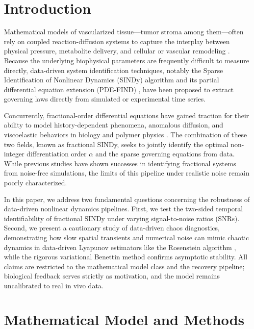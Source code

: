 \documentclass[review,3p,times]{elsarticle}
\begin{document}
\section{Introduction}
Mathematical models of vascularized tissue---tumor stroma among them---often rely on coupled reaction-diffusion systems to capture the interplay between physical pressure, metabolite delivery, and cellular or vascular remodeling \cite{brunton2016sindy, rudy2017data}. Because the underlying biophysical parameters are frequently difficult to measure directly, data-driven system identification techniques, notably the Sparse Identification of Nonlinear Dynamics (SINDy) algorithm \cite{brunton2016sindy} and its partial differential equation extension (PDE-FIND) \cite{rudy2017data}, have been proposed to extract governing laws directly from simulated or experimental time series. 

Concurrently, fractional-order differential equations have gained traction for their ability to model history-dependent phenomena, anomalous diffusion, and viscoelastic behaviors in biology and polymer physics \cite{podlubny1999fractional}. The combination of these two fields, known as fractional SINDy, seeks to jointly identify the optimal non-integer differentiation order $\alpha$ and the sparse governing equations from data. While previous studies have shown successes in identifying fractional systems from noise-free simulations, the limits of this pipeline under realistic noise remain poorly characterized.

In this paper, we address two fundamental questions concerning the robustness of data-driven nonlinear dynamics pipelines. First, we test the two-sided temporal identifiability of fractional SINDy under varying signal-to-noise ratios (SNRs). Second, we present a cautionary study of data-driven chaos diagnostics, demonstrating how slow spatial transients and numerical noise can mimic chaotic dynamics in data-driven Lyapunov estimators like the Rosenstein algorithm \cite{rosenstein1993practical}, while the rigorous variational Benettin method \cite{benettin1980lyapunov} confirms asymptotic stability. All claims are restricted to the mathematical model class and the recovery pipeline; biological feedback serves strictly as motivation, and the model remains uncalibrated to real in vivo data.

\section{Mathematical Model and Methods}
\end{document}
